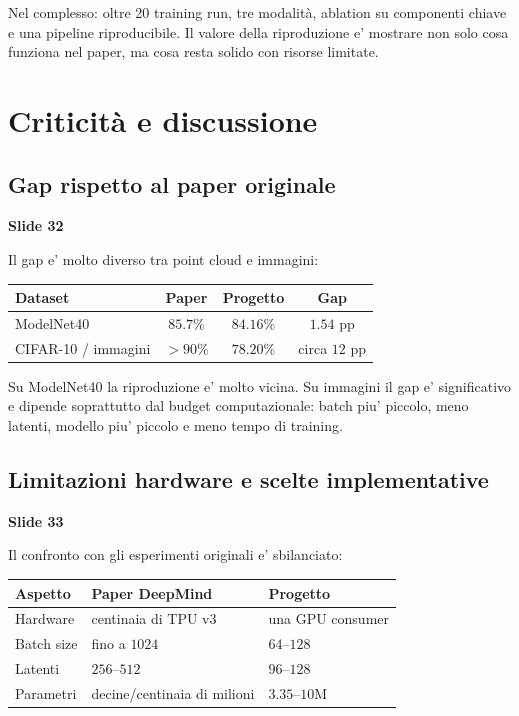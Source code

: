 \documentclass[11pt,a4paper]{article}
\newcommand{\slide}[1]{\textcolor{mainblue}{\textbf{Slide #1}}}
\begin{document}
Nel complesso: oltre 20 training run, tre modalit\`a, ablation su componenti
chiave e una pipeline riproducibile. Il valore della riproduzione e' mostrare
non solo cosa funziona nel paper, ma cosa resta solido con risorse limitate.

\section{Criticit\`a e discussione}

\subsection{Gap rispetto al paper originale}
\slide{32}

Il gap e' molto diverso tra point cloud e immagini:
\begin{center}
\begin{tabular}{lccc}
\toprule
\textbf{Dataset} & \textbf{Paper} & \textbf{Progetto} & \textbf{Gap} \\
\midrule
ModelNet40 & $85.7\%$ & $84.16\%$ & $1.54$ pp \\
CIFAR-10 / immagini & $>90\%$ & $78.20\%$ & circa $12$ pp \\
\bottomrule
\end{tabular}
\end{center}

Su ModelNet40 la riproduzione e' molto vicina. Su immagini il gap e'
significativo e dipende soprattutto dal budget computazionale: batch piu'
piccolo, meno latenti, modello piu' piccolo e meno tempo di training.

\subsection{Limitazioni hardware e scelte implementative}
\slide{33}

Il confronto con gli esperimenti originali e' sbilanciato:
\begin{center}
\begin{tabularx}{\linewidth}{l X X}
\toprule
\textbf{Aspetto} & \textbf{Paper DeepMind} & \textbf{Progetto} \\
\midrule
Hardware & centinaia di TPU v3 & una GPU consumer \\
Batch size & fino a $1024$ & $64$--$128$ \\
Latenti & $256$--$512$ & $96$--$128$ \\
Parametri & decine/centinaia di milioni & $3.35$--$10$M \\
\bottomrule
\end{tabularx}
\end{center}
\end{document}
